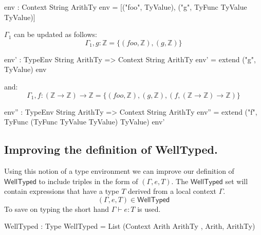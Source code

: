 \begin{code}
env : Context String ArithTy
env = [("foo", TyValue), ("g", TyFunc TyValue TyValue)]
\end{code}

\noindent
$\Gamma_{1}$ can be updated as follows:
\[
\Gamma_{1},g:\mathbb{Z} =\{(foo,\mathbb{Z}),(g,\mathbb{Z})\}
\]
\begin{code}
env' : TypeEnv String ArithTy => Context String ArithTy
env' = extend ("g", TyValue) env
\end{code}
\noindent
and:
\[
\Gamma_{1},f:(\mathbb{Z}\rightarrow\mathbb{Z})\rightarrow\mathbb{Z} =\{(foo,\mathbb{Z}),(g,\mathbb{Z}),(f,(\mathbb{Z}\rightarrow\mathbb{Z})\rightarrow\mathbb{Z})\}
\]
\begin{code}
env'' : TypeEnv String ArithTy => Context String ArithTy
env'' = extend ("f", TyFunc (TyFunc TyValue TyValue)
                             TyValue)
                 env'
\end{code}

\subsection{Improving the definition of \textsf{WellTyped}.}
\label{sec:types:example}

Using this notion of a type environment we can improve our definition of $\mathsf{WellTyped}$ to include triples in the form of $(\Gamma,e,T)$.
The $\mathsf{WellTyped}$ set will contain expressions that have a type $T$ derived from a local context $\Gamma$.
\[
(\Gamma,e,T)\in\mathsf{WellTyped}
\]
\noindent
To save on typing the short hand $\Gamma\vdash e:T$ is used.

\begin{code}
WellTyped : Type
WellTyped = List (Context Arith ArithTy , Arith, ArithTy)
\end{code}



